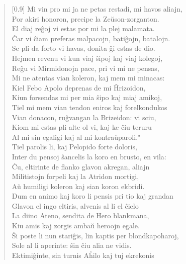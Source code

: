 \begin{verse}[0.9\textwidth]
          Mi vin pro mi ja ne petas restadi, mi havos aliajn,\\
          Por akiri honoron, precipe la Ze\u uson-zorganton.\\
          El diaj re\^goj vi estas por mi la plej malamata.\\
          \^Car vi \^ciam preferas malpacojn, bati\^gojn, batalojn.\\
          Se pli da forto vi havas, donita \^gi estas de dio.\\
          Hejmen revenu vi kun viaj \^sipoj kaj viaj kolegoj,\\
          Re\^gu vi Mirmidonojn pace, pri vi mi ne pensas,\\
          Mi ne atentas vian koleron, kaj mem mi minacas:\\
          Kiel Febo Apolo deprenas de mi \^Hrizoidon,\\
          Kiun forsendas mi per mia \^sipo kaj miaj amikoj,\\
          Tiel mi mem vian tendon eniros kaj forelkondukos\\
          Vian donacon, ru\^gvangan la Brizeidon: vi sciu,\\
          Kiom mi estas pli alte ol vi, kaj ke \^ciu teruru\\
          Al mi sin egaligi kaj al mi kontra\u uparoli."\\
           \vin  Tiel parolis li, kaj Pelopido forte doloris,\\
          Inter du pensoj \^sancelis la koro en brusto, en vila:\\
          \^Cu, eltirinte de flanko glavon akregan, aliajn\\
          Militistojn forpeli kaj la Atridon mortigi,\\
          A\u u humiligi koleron kaj sian koron ekbridi.\\
          Dum en animo kaj koro li pensis pri tio kaj grandan\\
          Glavon el ingo eltiris, alvenis al li el \^cielo\\
          La diino Ateno, sendita de Hero blankmana,\\
          Kiu amis kaj zorgis amba\u u heroojn egale.\\
          \^Si poste li nun stari\^gis, lin kaptis per blondkapoharoj,\\
          Sole al li aperinte: \^sin \^ciu alia ne vidis.\\
          Ektimi\^ginte, sin turnis A\^hilo kaj tuj ekrekonis\\

\end{verse}
